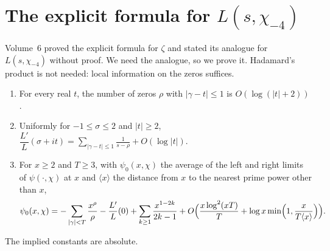 \section{The explicit formula for \texorpdfstring{$L(s,\chi_{-4})$}{L(s,chi-4)}}

Volume~6 proved the explicit formula for $\zeta$ and stated its analogue for $L(s,\chi_{-4})$ without proof. We need the analogue, so we prove it. Hadamard's product is not needed: local information on the zeros suffices.

\begin{theorem}\label{thm:explicitchi}
\leavevmode
\begin{enumerate}[label=(\alph*)]
\item For every real $t$, the number of zeros $\rho$ with $|\gamma-t|\le1$ is $O(\log(|t|+2))$.
\item Uniformly for $-1\le\sigma\le2$ and $|t|\ge2$, $\dfrac{L'}L(\sigma+it)=\displaystyle\sum_{|\gamma-t|\le1}\frac1{s-\rho}+O(\log|t|)$.
\item For $x\ge2$ and $T\ge3$, with $\psi_0(x,\chi)$ the average of the left and right limits of $\psi(\cdot,\chi)$ at $x$ and $\langle x\rangle$ the distance from $x$ to the nearest prime power other than $x$,
\[
\psi_0(x,\chi)=-\sum_{|\gamma|<T}\frac{x^\rho}\rho-\frac{L'}L(0)+\sum_{k\ge1}\frac{x^{1-2k}}{2k-1}+O\Bigl(\frac{x\log^2(xT)}T+\log x\min\Bigl(1,\frac x{T\langle x\rangle}\Bigr)\Bigr).
\]
\end{enumerate}
The implied constants are absolute.
\end{theorem}

